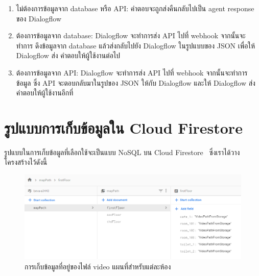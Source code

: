 \begin{enumerate}
  \item ไม่ต้องการข้อมูลจาก database หรือ API: คำตอบจะถูกส่งคืนกลับไปเป็น agent response
  ของ Dialogflow
  \item ต้องการข้อมูลจาก database: Dialogflow จะทำการส่ง API ไปที่ webhook จากนั้นจะทำการ
  ดึงข้อมูลจาก database แล้วส่งกลับไปยัง Dialogflow ในรูปแบบของ JSON เพื่อให้ Dialogflow ส่ง
  คำตอบให้ผู้ใช้งานต่อไป
  \item ต้องการข้อมูลจาก API: Dialogflow จะทำการส่ง API ไปที่ webhook จากนั้นจะทำการข้อมูล
  ซึ่ง API จะตอบกลับมาในรูปของ JSON ให้กับ Dialogflow และให้ Dialogflow ส่งคำตอบให้ผู้ใช้งานอีกที่
\end{enumerate}

\section{รูปแบบการเก็บข้อมูลใน Cloud Firestore}
รูปแบบในการเก็บข้อมูลที่เลือกใช้จะเป็นแบบ NoSQL บน Cloud Firestore~\cite{fs-doc} ซึ่งเราได้วางโครงสร้างไว้ดังนี้ 
\begin{figure}[hbt!]
  \begin{center}
  \includegraphics[width=\textwidth,keepaspectratio]{pic/database_mapPath.png}
  \end{center}
  \caption{การเก็บข้อมูลที่อยู่ของไฟล์ video แผนที่สำหรับแต่ละห้อง}
  \label{fig:db_mapPath}
\end{figure}

